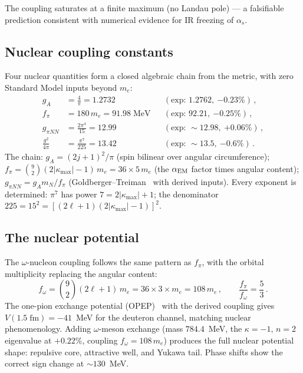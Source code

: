 \documentclass[aps,prd,twocolumn,superscriptaddress,nofootinbib,longbibliography]{revtex4-2}
\newcommand{\kmax}{|\kappa_{\mathrm{max}}|}
\begin{document}
The coupling saturates at a finite maximum (no Landau pole) ---
a falsifiable prediction consistent with numerical evidence for IR
freezing of $\alpha_s$.

\subsection{Nuclear coupling constants}

Four nuclear quantities form a closed algebraic chain from the
metric, with zero Standard Model inputs beyond $m_e$:
\begin{align}
  g_A &= \frac{4}{\pi} = 1.2732
    &&(\text{exp: }1.2762,\ {-0.23\%})\,,
    \label{eq:gA}\\
  f_\pi &= 180\,m_e = 91.98\;\text{MeV}
    &&(\text{exp: }92.21,\ {-0.25\%})\,,
    \label{eq:fpi}\\
  g_{\pi NN} &= \frac{2\pi^4}{15} = 12.99
    &&(\text{exp: }{\sim}12.98,\ {+0.06\%})\,,
    \label{eq:gpiNN}\\
  \frac{g^2}{4\pi} &= \frac{\pi^7}{225} = 13.42
    &&(\text{exp: }{\sim}13.5,\ {-0.6\%})\,.
    \label{eq:g2}
\end{align}
The chain: $g_A = (2j+1)^2/\pi$ (spin bilinear over angular
circumference); $f_\pi = \binom{9}{2}(2\kmax - 1)\,m_e = 36 \times
5\,m_e$ (the $\alpha_{\rm EM}$ factor times angular content);
$g_{\pi NN} = g_A m_N/f_\pi$ (Goldberger--Treiman~\cite{Goldberger1958} with derived
inputs).  Every exponent is determined: $\pi^7$ has power
$7 = 2\kmax + 1$; the denominator $225 = 15^2 =
[(2\ell+1)(2\kmax-1)]^2$.

\subsection{The nuclear potential}

The $\omega$-nucleon coupling follows the same pattern as $f_\pi$,
with the orbital multiplicity replacing the angular content:
\begin{equation}
  f_\omega = \binom{9}{2}(2\ell+1)\,m_e = 36 \times 3 \times m_e
  = 108\,m_e\,,
  \qquad \frac{f_\pi}{f_\omega} = \frac{5}{3}\,.
\end{equation}
The one-pion exchange potential (OPEP)~\cite{Machleidt2001,Epelbaum2009} with the derived coupling gives
$V(1.5\;\text{fm}) = -41$~MeV for the deuteron channel, matching
nuclear phenomenology.  Adding $\omega$-meson exchange (mass
$784.4$~MeV, the $\kappa = -1$, $n = 2$ eigenvalue at $+0.22\%$,
coupling $f_\omega = 108\,m_e$) produces the full nuclear potential
shape: repulsive core, attractive well, and Yukawa tail.  Phase
shifts show the correct sign change at $\sim\!130$~MeV.
\end{document}

